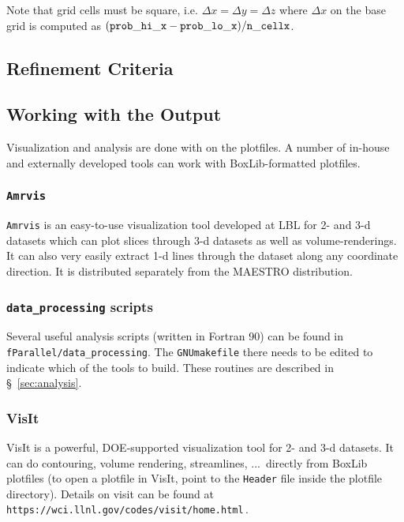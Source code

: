 Note that grid cells must be square, i.e. $\Delta x = \Delta y = \Delta z$
where $\Delta x$ on the base grid is computed as $({\tt prob\_hi\_x}
- {\tt prob\_lo\_x})/{\tt n\_cellx}$. 

\subsection{Refinement Criteria}

\subsection{Working with the Output}

Visualization and analysis are done with on the plotfiles.  A
number of in-house and externally developed tools can work 
with BoxLib-formatted plotfiles.


\subsubsection{\tt Amrvis}

{\tt Amrvis} is an easy-to-use visualization tool developed at LBL for
2- and 3-d datasets which can plot slices through 3-d datasets as well
as volume-renderings.  It can also very easily extract 1-d lines
through the dataset along any coordinate direction.  It is distributed
separately from the MAESTRO distribution.


\subsubsection{{\tt data\_processing} scripts}

Several useful analysis scripts (written in Fortran 90) can be found
in {\tt fParallel/data\_processing}.  The {\tt GNUmakefile} there
needs to be edited to indicate which of the tools to build.  These
routines are described in \S~\ref{sec:analysis}.


\subsubsection{VisIt}

VisIt is a powerful, DOE-supported visualization tool for 2- and 3-d
datasets.  It can do contouring, volume rendering, streamlines, ...\
directly from BoxLib plotfiles (to open a plotfile in VisIt, point to
the {\tt Header} file inside the plotfile directory).  Details on
visit can be found at {\tt https://wci.llnl.gov/codes/visit/home.html}\,.



